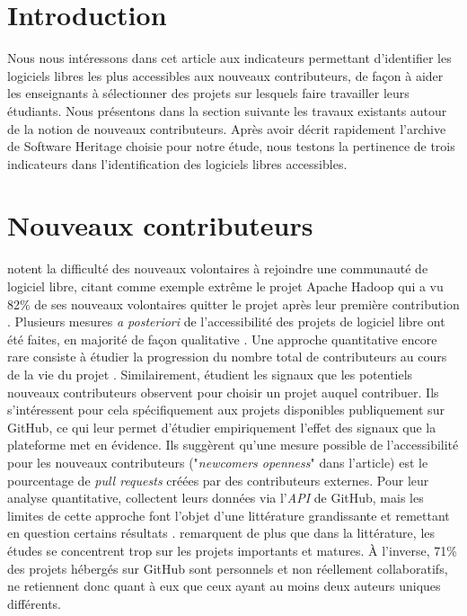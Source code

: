 \documentclass[dvipsnames,runningheads]{llncs}
\newcommand{\en}[1]{\foreignlanguage{english}{\emph{#1}}}
\begin{document}

    \section{Introduction}

    Nous nous intéressons dans cet article aux indicateurs permettant d'identifier les logiciels libres les
    plus accessibles aux nouveaux contributeurs, de façon à aider les enseignants à sélectionner des projets
    sur lesquels faire travailler leurs étudiants. Nous présentons dans la section suivante les travaux
    existants autour de la notion de nouveaux contributeurs. Après avoir décrit rapidement l'archive de
    Software Heritage choisie pour notre étude, nous testons la pertinence de trois indicateurs dans
    l'identification des logiciels libres accessibles.

    \section{Nouveaux contributeurs}

    \textcite{barriers-2018} notent la difficulté des nouveaux volontaires à rejoindre une communauté de
    logiciel libre, citant comme exemple extrême le projet Apache Hadoop qui a vu 82\% de ses nouveaux
    volontaires quitter le projet après leur première contribution \parencite{hadoop-dropout-2013}. Plusieurs
    mesures \emph{a posteriori} de l'accessibilité des projets de logiciel libre ont été faites, en majorité
    de façon qualitative \parencites{newcomers-accessibility-2016}{newcomers-onboarding-2018}. Une approche
    quantitative encore rare consiste à étudier la progression du nombre total de contributeurs au cours de la
    vie du projet \cite{contributor-count-2006}. Similairement, \textcite{signals-2019} étudient les signaux
    que les potentiels nouveaux contributeurs observent pour choisir un projet auquel contribuer. Ils
    s'intéressent pour cela spécifiquement aux projets disponibles publiquement sur GitHub, ce qui leur permet
    d'étudier empiriquement l'effet des signaux que la plateforme met en évidence. Ils suggèrent qu'une mesure
    possible de l'accessibilité pour les nouveaux contributeurs ("\en{newcomers openness}" dans l'article) est
    le pourcentage de \en{pull requests} créées par des contributeurs externes. Pour leur analyse
    quantitative, \textcite{signals-2019} collectent leurs données via l'\en{API} de GitHub, mais les limites
    de cette approche font l'objet d'une littérature grandissante et remettant en question certains résultats
    \parencite{mining-github-2014,penumbra-oss-2022}. \textcite{barriers-meta-2015} remarquent de plus que
    dans la littérature, les études se concentrent trop sur les projets importants et matures. À l'inverse,
    71\% des projets hébergés sur GitHub sont personnels et non réellement collaboratifs,
    \textcite{mining-github-2014} ne retiennent donc quant à eux que ceux ayant au moins deux auteurs uniques
    différents.
\end{document}
